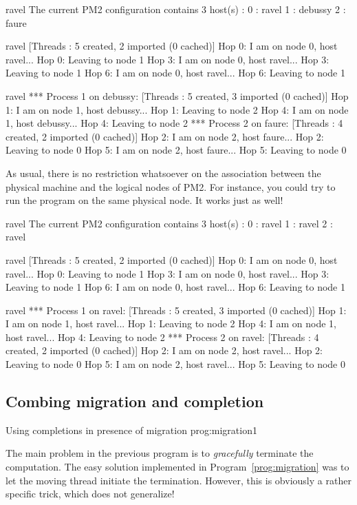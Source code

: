 \begin{shell}
ravel%
The current PM2 configuration contains 3 host(s) :
0 : ravel
1 : debussy
2 : faure

ravel%
[Threads : 5 created, 2 imported (0 cached)]
Hop 0: I am on node 0, host ravel...
Hop 0: Leaving to node 1
Hop 3: I am on node 0, host ravel...
Hop 3: Leaving to node 1
Hop 6: I am on node 0, host ravel...
Hop 6: Leaving to node 1

ravel%
*** Process 1 on debussy:
[Threads : 5 created, 3 imported (0 cached)]
Hop 1: I am on node 1, host debussy...
Hop 1: Leaving to node 2
Hop 4: I am on node 1, host debussy...
Hop 4: Leaving to node 2
*** Process 2 on faure:
[Threads : 4 created, 2 imported (0 cached)]
Hop 2: I am on node 2, host faure...
Hop 2: Leaving to node 0
Hop 5: I am on node 2, host faure...
Hop 5: Leaving to node 0
\end{shell}
As usual, there is no restriction whatsoever on the association
between the physical machine and the logical nodes of PM2. For
instance, you could try to run the program on the same physical node.
It works just as well!
\begin{shell}
ravel%
The current PM2 configuration contains 3 host(s) :
0 : ravel
1 : ravel
2 : ravel

ravel%
[Threads : 5 created, 2 imported (0 cached)]
Hop 0: I am on node 0, host ravel...
Hop 0: Leaving to node 1
Hop 3: I am on node 0, host ravel...
Hop 3: Leaving to node 1
Hop 6: I am on node 0, host ravel...
Hop 6: Leaving to node 1

ravel%
*** Process 1 on ravel:
[Threads : 5 created, 3 imported (0 cached)]
Hop 1: I am on node 1, host ravel...
Hop 1: Leaving to node 2
Hop 4: I am on node 1, host ravel...
Hop 4: Leaving to node 2
*** Process 2 on ravel:
[Threads : 4 created, 2 imported (0 cached)]
Hop 2: I am on node 2, host ravel...
Hop 2: Leaving to node 0
Hop 5: I am on node 2, host ravel...
Hop 5: Leaving to node 0
\end{shell}

\subsection{Combing migration and completion}

 {Using completions in presence of
  migration} {prog:migration1}

The main problem in the previous program is to \emph{gracefully} terminate
the computation. The easy solution implemented in
Program~\ref{prog:migration} was to let the moving thread initiate the
termination. However, this is obviously a rather specific trick, which
does not generalize!

